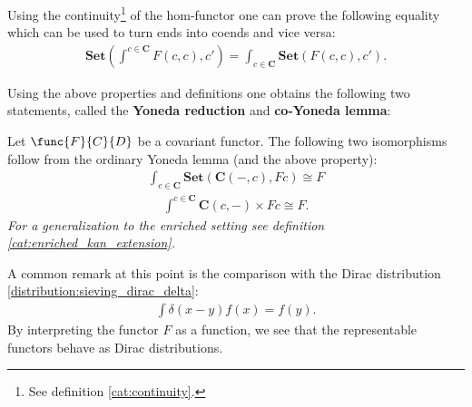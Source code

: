     \begin{property}
        Using the continuity\footnote{See definition \ref{cat:continuity}.} of the hom-functor one can prove the following equality which can be used to turn ends into coends and vice versa:
        \begin{gather}
            \mathbf{Set}\left(\int^{c\in\mathbf{C}}F(c, c), c'\right) = \int_{c\in\mathbf{C}}\mathbf{Set}\left(F(c, c), c'\right).
        \end{gather}
    \end{property}

    Using the above properties and definitions one obtains the following two statements, called the \textbf{Yoneda reduction} and \textbf{co-Yoneda lemma}:
    \begin{theorem}\label{cat:ninja_yoneda}
        Let $\func{F}{C}{D}$ be a covariant functor. The following two isomorphisms follow from the ordinary Yoneda lemma (and the above property):
        \begin{gather}
            \int_{c\in\mathbf{C}}\mathbf{Set}\left(\mathbf{C}(-, c), Fc\right)\cong F
        \end{gather}
        \begin{gather}
            \int^{c\in\mathbf{C}}\mathbf{C}(c, -)\times Fc\cong F.
        \end{gather}
        \emph{For a generalization to the enriched setting see definition \ref{cat:enriched_kan_extension}.}
    \end{theorem}
    \begin{remark}
        A common remark at this point is the comparison with the Dirac distribution \ref{distribution:sieving_dirac_delta}:
        \begin{gather}
            \int \delta(x-y)f(x) = f(y).
        \end{gather}
        By interpreting the functor $F$ as a function, we see that the representable functors behave as Dirac distributions.
    \end{remark}


